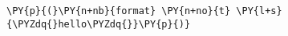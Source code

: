 \begin{Verbatim}[commandchars=\\\{\}]
\PY{p}{(}\PY{n+nb}{format} \PY{n+no}{t} \PY{l+s}{\PYZdq{}hello\PYZdq{}}\PY{p}{)}
\end{Verbatim}
